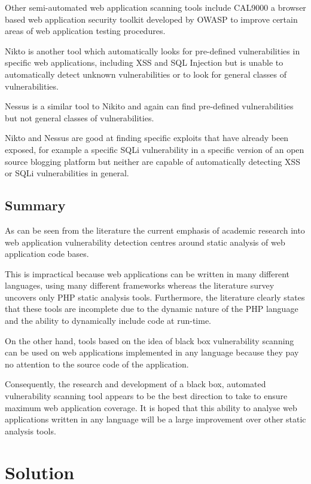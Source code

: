 \documentclass[12pt,a4paper]{article}
\begin{document}
Other semi-automated web application scanning tools include CAL9000 \cite{Loomis:2009:Online} a browser based web application security toolkit developed by OWASP to improve certain areas of web application testing procedures. \cite{Grossman2007}

Nikto is another tool which automatically looks for pre-defined vulnerabilities in specific web applications, including XSS and SQL Injection but is unable to automatically detect unknown vulnerabilities or to look for general classes of vulnerabilities. \cite{Nikto:2009:Online} 

Nessus is a similar tool to Nikito and again can find pre-defined vulnerabilities but not general classes of vulnerabilities. \cite{Nessus:2010:Online}

Nikto and Nessus are good at finding specific exploits that have already been exposed, for example a specific SQLi vulnerability in a specific version of an open source blogging platform but neither are capable of automatically detecting XSS or SQLi vulnerabilities in general.

\subsection{Summary}
As can be seen from the literature the current emphasis of academic research into web application vulnerability detection centres around static analysis of web application code bases.

This is impractical because web applications can be written in many different languages, using many different frameworks whereas the literature survey uncovers only PHP static analysis tools.  Furthermore, the literature clearly states that these tools are incomplete due to the dynamic nature of the PHP language and the ability to dynamically include code at run-time.

On the other hand, tools based on the idea of black box vulnerability scanning can be used on web applications implemented in any language because they pay no attention to the source code of the application.

Consequently, the research and development of a black box, automated vulnerability scanning tool appears to be the best direction to take to ensure maximum web application coverage.  It is hoped that this ability to analyse web applications written in any language will be a large improvement over other static analysis tools.

\section{Solution}
\end{document}
